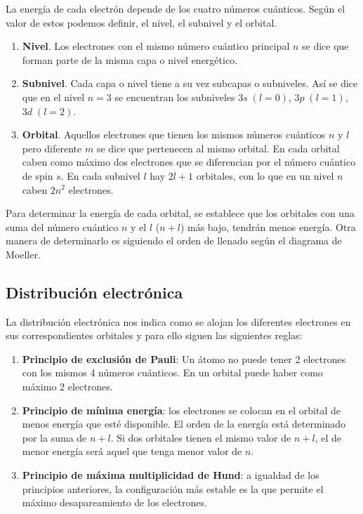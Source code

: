 La energía de cada electrón depende de los cuatro números cuánticos.
Según el valor de estos podemos definir, el nivel, el subnivel y el orbital.
\begin{enumerate}[label=\numberballmDarkTeal]
        \item \textbf{Nivel}.
        Los electrones con el mismo número cuántico principal $n$ se dice que forman parte de la misma capa o nivel energético.
        \item \textbf{Subnivel}.
        Cada capa o nivel tiene a su vez subcapas o subniveles.
        Así se dice que en el nivel $n=3$ se encuentran los subniveles $3s\;(l=0)$, $3p\;(l=1)$, $3d\;(l=2)$.
        \item \textbf{Orbital}. Aquellos electrones que tienen los mismos números cuánticos $n$ y $l$ pero diferente $m$ se dice que pertenecen al mismo orbital.
        En cada orbital caben como máximo dos electrones que se diferencian por el número cuántico de spin $s$.
        En cada subnivel $l$ hay $2l+1$ orbitales, con lo que en un nivel $n$ caben $2n^2$ electrones.
\end{enumerate}

Para determinar la energía de cada orbital, se establece que los orbitales con una suma del número cuántico \(n\) y el \(l\) (\(n + l\)) más bajo, tendrán menos energía.
Otra manera de determinarlo es siguiendo el orden de llenado según el diagrama de Moeller.

\subsection{Distribución electrónica}\label{subsec:distribucion-electronica}

La distribución electrónica nos indica como se alojan los diferentes electrones en sus correspondientes orbitales y para ello siguen las siguientes reglas:

\begin{enumerate}[label=\numberballmDarkTeal]
        \item \textbf{Principio de exclusión de Pauli}: Un átomo no puede tener 2 electrones con los mismos 4 números cuánticos.
        En un orbital puede haber como máximo 2 electrones.
        \item \textbf{Principio de mínima energía}: los electrones se colocan en el orbital de menos energía que esté disponible.
        El orden de la energía está determinado por la suma de $n + l$.
        Si dos orbitales tienen el mismo valor de $n+l$, el de menor energía será aquel que tenga menor valor de $n$.

        \item \textbf{Principio de máxima multiplicidad de Hund}: a igualdad de los principios anteriores, la configuración más estable es la que permite el máximo desapareamiento de los electrones.
\end{enumerate}

